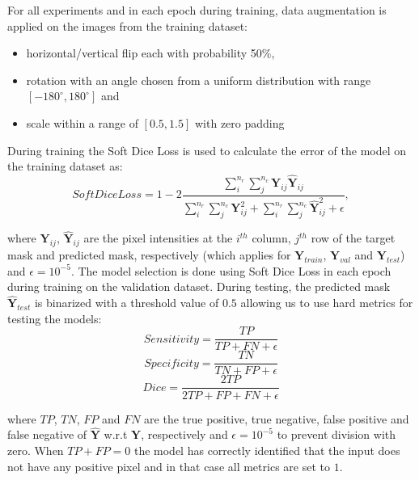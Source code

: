 \documentclass{elsarticle}
\begin{document}
For all experiments and in each epoch during training, data
augmentation is applied on the images from the training dataset:
\begin{itemize}
  \item horizontal/vertical flip each with probability 50\%,
  \item rotation with an angle chosen from a uniform distribution
    with range $[-180^{\circ}, 180^{\circ}]$ and
  \item scale within a range of $[0.5, 1.5]$ with zero padding
\end{itemize}

During training the Soft Dice Loss is used to calculate the error of
the model on the training dataset as:
\begin{equation}
  Soft Dice Loss = 1 -
  2\frac{\sum\limits^{n_r}_i\sum\limits^{n_c}_j\bm{Y}_{ij}\hat{\bm{Y}}_{ij}}{\sum\limits^{n_r}_i\sum\limits^{n_c}_j\bm{Y}_{ij}^2
  + \sum\limits^{n_r}_i\sum\limits^{n_c}_j\hat{\bm{Y}}_{ij}^2 + \epsilon},
\end{equation}

where $\bm{Y}_{ij}$, $\hat{\bm{Y}}_{ij}$ are the pixel intensities at
the $i^{th}$ column, $j^{th}$ row of the target mask and predicted
mask, respectively (which applies for $\bm{Y}_{train}$,
$\bm{Y}_{val}$ and $\bm{Y}_{test}$) and $\epsilon=10^{-5}$.
The model selection is done using Soft Dice Loss in each epoch during
training on the validation dataset.
During testing, the predicted mask $\hat{\bm{Y}}_{test}$ is binarized
with a threshold value of $0.5$ allowing us to use hard metrics for
testing the models:
\begin{equation}
  Sensitivity = \frac{TP}{TP + FN + \epsilon}
\end{equation}
\begin{equation}
  Specificity = \frac{TN}{TN + FP + \epsilon}
\end{equation}
\begin{equation}
  Dice = \frac{2TP}{2TP + FP + FN + \epsilon}
\end{equation}

where $TP$, $TN$, $FP$ and $FN$ are the true positive, true negative,
false positive and false negative of $\hat{\bm{Y}}$ w.r.t $\bm{Y}$,
respectively and $\epsilon=10^{-5}$ to prevent division with zero.
When $TP+FP=0$ the model has correctly identified that the input does
not have any positive pixel and in that case all metrics are set to $1$.
\end{document}
